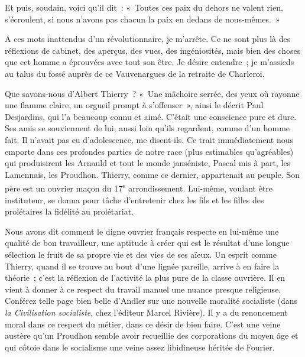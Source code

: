 \documentclass[french,twoside]{book} %
\begin{document}
\noindent Et puis, soudain, voici qu’il dit : « Toutes ces paix du dehors ne valent rien, s’écroulent, si nous n’avons pas chacun la paix en dedans de nous-mêmes. »‌\par
A ces mots inattendus d’un révolutionnaire, je m’arrête. Ce ne sont plus là des réflexions de cabinet, des aperçus, des vues, des ingéniosités, mais bien des choses que cet homme a éprouvées avec tout son être. Je désire entendre ; je m’assieds au talus du fossé auprès de ce Vauvenargues de la retraite de Charleroi.‌\par
Que savons-nous d’Albert Thierry ? « Une mâchoire serrée, des yeux où rayonne une flamme claire, un orgueil prompt à s’offenser », ainsi le décrit Paul Desjardins, qui l’a beaucoup connu et aimé. C’était une conscience pure et dure. Ses amis se souviennent de lui, aussi loin qu’ils regardent, comme d’un homme fait. Il n’avait pas eu d’adolescence, me disent-ils. Ce trait immédiatement nous emporte dans ces profondes parties de notre race (plus estimables qu’agréables) qui produisirent les Arnauld et tout le monde janséniste, Pascal mis à part, les Lamennais, les Proudhon. Thierry, comme ce dernier, appartenait au peuple. Son père est un ouvrier maçon du 17\textsuperscript{e} arrondissement. Lui-même, voulant être instituteur, se donna pour tâche d’entretenir chez les fils et les filles des prolétaires la fidélité au prolétariat.‌\par
Nous avons dit comment le digne ouvrier français respecte en lui-même une qualité de bon travailleur, une aptitude à créer qui est le résultat d’une longue sélection le fruit de sa propre vie et des vies de ses aïeux. Un esprit comme Thierry, quand il se trouve au bout d’une lignée pareille, arrive à en faire la théorie ; c’est la réflexion de l’activité la plus pure de la classe ouvrière. Il en vient à donner à ce respect du travail manuel une nuance presque religieuse. Conférez telle page bien belle d’Andler sur une nouvelle moralité socialiste (dans {\itshape la Civilisation socialiste}, chez l’éditeur Marcel Rivière). Il y a du renoncement moral dans ce respect du métier, dans ce désir de bien faire. C’est une veine austère qu’un Proudhon semble avoir recueillie des corporations du moyen âge et qui côtoie dans le socialisme une veine assez libidineuse héritée de Fourier.‌\par
\end{document}
